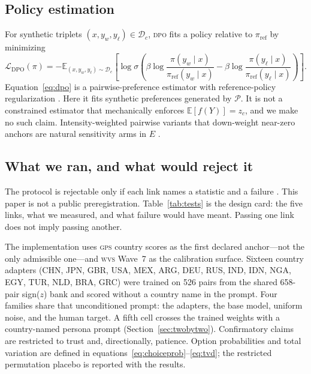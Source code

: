 \documentclass[10pt,letterpaper]{article}
\newcommand{\E}{\mathbb{E}}
\newcommand{\Pcal}{\mathcal{P}}
\newcommand{\Dcal}{\mathcal{D}}
\newcommand{\WVS}{\textsc{wvs}}
\newcommand{\GPS}{\textsc{gps}}
\newcommand{\DPO}{\textsc{dpo}}
\begin{document}
\subsection{Policy estimation}
For synthetic triplets $(x,y_w,y_\ell)\in\Dcal_c$, \DPO{} fits a policy relative to $\pi_{\mathrm{ref}}$ by minimizing
\begin{equation}
\mathcal{L}_{\mathrm{DPO}}(\pi)= -\E_{(x,y_w,y_\ell)\sim\Dcal_c}\left[\log\sigma\!\left(\beta\log\frac{\pi(y_w\mid x)}{\pi_{\mathrm{ref}}(y_w\mid x)}-\beta\log\frac{\pi(y_\ell\mid x)}{\pi_{\mathrm{ref}}(y_\ell\mid x)}\right)\right].
\label{eq:dpo}
\end{equation}
Equation~\eqref{eq:dpo} is a pairwise-preference estimator with reference-policy regularization \cite{rafailov2023}. Here it fits synthetic preferences generated by $\Pcal$. It is not a constrained estimator that mechanically enforces $\E[f(Y)]=z_c$, and we make no such claim. Intensity-weighted pairwise variants that down-weight near-zero anchors are natural sensitivity arms in $E$ \cite{sharifnassab2024}.

\subsection{What we ran, and what would reject it}\label{sec:designcard}
The protocol is rejectable only if each link names a statistic and a failure \cite{dell2026,cvprofiles2026}. This paper is not a public preregistration. Table~\ref{tab:tests} is the design card: the five links, what we measured, and what failure would have meant. Passing one link does not imply passing another.

The implementation uses \GPS{} country scores as the first declared anchor---not the only admissible one---and \WVS{} Wave~7 as the calibration surface. Sixteen country adapters (CHN, JPN, GBR, USA, MEX, ARG, DEU, RUS, IND, IDN, NGA, EGY, TUR, NLD, BRA, GRC) were trained on 526 pairs from the shared 658-pair sign($z$) bank and scored without a country name in the prompt. Four families share that unconditioned prompt: the adapters, the base model, uniform noise, and the human target. A fifth cell crosses the trained weights with a country-named persona prompt (Section~\ref{sec:twobytwo}). Confirmatory claims are restricted to trust and, directionally, patience. Option probabilities and total variation are defined in equations~\eqref{eq:choiceprob}--\eqref{eq:tvd}; the restricted permutation placebo is reported with the results.
\end{document}
